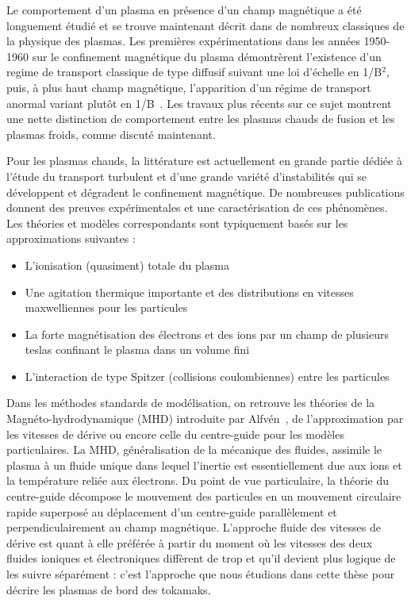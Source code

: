 \begin{refsection}
Le comportement d'un plasma en présence d'un champ magnétique a été
longuement étudié et se trouve maintenant décrit dans de nombreux classiques de
la physique des plasmas.
Les premières expérimentations dans les années 1950-1960 sur le confinement
magnétique du plasma démontrèrent l'existence d'un regime de transport classique
de type diffusif suivant une loi d'échelle en 1/B$^2$, puis, à plus haut champ
magnétique, l'apparition d'un régime de transport anormal variant plutôt en
1/B~\parencite{Bohm,Simon55,Yoshikawa,Janes,Rozhansky}. Les travaux plus
récents sur ce sujet montrent une nette distinction de
comportement entre les plasmas chauds de fusion et les plasmas froids, comme
discuté maintenant.

Pour les plasmas chauds, la littérature est actuellement en grande partie dédiée
à l'étude du transport turbulent et d'une grande variété d'instabilités qui
se développent et dégradent le confinement magnétique. De nombreuses
publications donnent des preuves expérimentales et une caractérisation de ces
phénomènes. Les théories et modèles correspondants sont typiquement basés sur
les approximations suivantes :

\begin{itemize}
  \item L'ionisation (quasiment) totale du plasma
  \item Une agitation thermique importante et des distributions en
  vitesses maxwelliennes pour les particules
  \item La forte magnétisation des électrons et des ions par un champ de
  plusieurs teslas confinant le plasma dans un volume fini
  \item L'interaction de type Spitzer (collisions coulombiennes) entre les
  particules
\end{itemize}

Dans les méthodes standards de modélisation, on retrouve les théories de la
Magnéto-hydrodynamique
 (MHD) introduite
par Alfvén~\parencite{Alfven}, de l'approximation par les vitesses de dérive ou encore celle du centre-guide
pour les modèles particulaires.
La MHD, généralisation de la mécanique des fluides, assimile le plasma à un fluide unique dans lequel
l'inertie est essentiellement due aux ions et la température reliée aux
électrons. Du point de vue particulaire, la
théorie du centre-guide décompose le mouvement des particules en un mouvement
circulaire rapide superposé au déplacement d'un centre-guide parallèlement et
perpendiculairement au champ magnétique. L'approche fluide des vitesses de
dérive est quant à elle préférée à partir du moment où les vitesses des deux fluides
ioniques et électroniques diffèrent de trop et qu'il devient plus logique de les
suivre séparément : c'est l'approche que nous étudions dans cette thèse pour
décrire les plasmas de bord des tokamaks.


\end{refsection}
